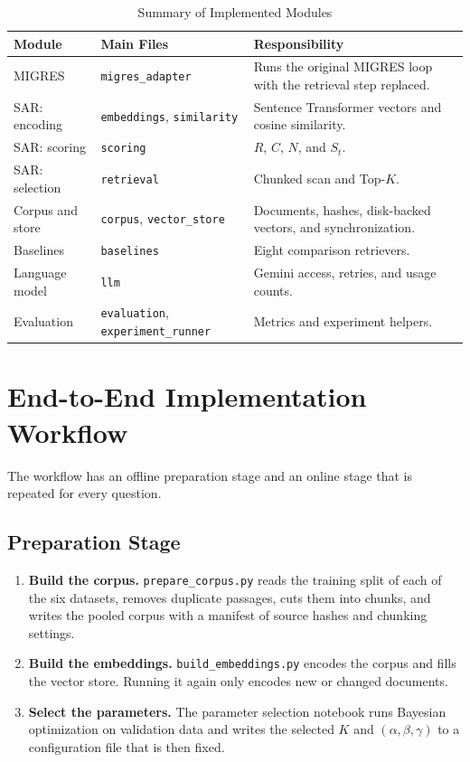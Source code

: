 \documentclass[12pt,a4paper]{report}
\begin{document}
\begin{table}[H]
\centering
\caption{Summary of Implemented Modules}
\label{tab:impl-modules}
\renewcommand{\arraystretch}{1.2}
\begin{tabular}{|p{1.7in}|p{1.9in}|p{2.45in}|}
\hline
\textbf{Module} & \textbf{Main Files} & \textbf{Responsibility} \\ \hline
MIGRES & \texttt{migres\_adapter} & Runs the original MIGRES loop with the retrieval step replaced. \\ \hline
SAR: encoding & \texttt{embeddings}, \texttt{similarity} & Sentence Transformer vectors and cosine similarity. \\ \hline
SAR: scoring & \texttt{scoring} & $R$, $C$, $N$, and $S_t$. \\ \hline
SAR: selection & \texttt{retrieval} & Chunked scan and Top-$K$. \\ \hline
Corpus and store & \texttt{corpus}, \texttt{vector\_store} & Documents, hashes, disk-backed vectors, and synchronization. \\ \hline
Baselines & \texttt{baselines} & Eight comparison retrievers. \\ \hline
Language model & \texttt{llm} & Gemini access, retries, and usage counts. \\ \hline
Evaluation & \texttt{evaluation}, \texttt{experiment\_runner} & Metrics and experiment helpers. \\ \hline
\end{tabular}
\end{table}

\section{End-to-End Implementation Workflow}
\label{sec:impl-workflow}

The workflow has an offline preparation stage and an online stage that is repeated for every question.

\subsection{Preparation Stage}

\begin{enumerate}[leftmargin=0.30in,itemsep=0.06in]
\item \textbf{Build the corpus.} \texttt{prepare\_corpus.py} reads the training split of each of the six datasets, removes duplicate passages, cuts them into chunks, and writes the pooled corpus with a manifest of source hashes and chunking settings.
\item \textbf{Build the embeddings.} \texttt{build\_embeddings.py} encodes the corpus and fills the vector store. Running it again only encodes new or changed documents.
\item \textbf{Select the parameters.} The parameter selection notebook runs Bayesian optimization on validation data and writes the selected $K$ and $(\alpha,\beta,\gamma)$ to a configuration file that is then fixed.
\end{enumerate}
\end{document}
